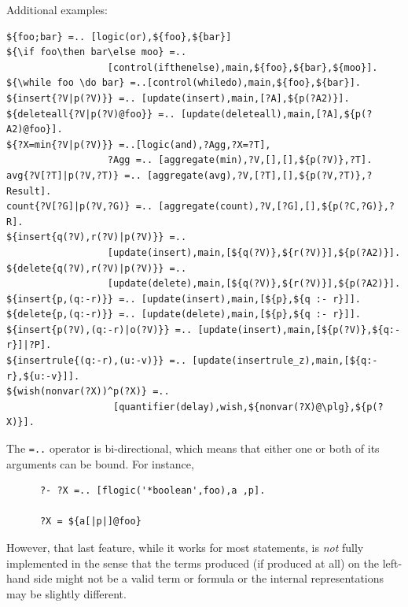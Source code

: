 \documentclass[11pt]{article}
\newcommand{\ERGO}{\mbox{\smaller{\ensuremath{\cal{E}}\smaller{{\sc{RGO}}}}}\xspace}
\newcommand{\FLSYSTEM}{\ERGO}
\begin{document}
\noindent
Additional examples:
\begin{verbatim}
${foo;bar} =.. [logic(or),${foo},${bar}]
${\if foo\then bar\else moo} =..
                  [control(ifthenelse),main,${foo},${bar},${moo}].
${\while foo \do bar} =..[control(whiledo),main,${foo},${bar}].
${insert{?V|p(?V)}} =.. [update(insert),main,[?A],${p(?A2)}].
${deleteall{?V|p(?V)@foo}} =.. [update(deleteall),main,[?A],${p(?A2)@foo}].
${?X=min{?V|p(?V)}} =..[logic(and),?Agg,?X=?T],
                  ?Agg =.. [aggregate(min),?V,[],[],${p(?V)},?T].
avg{?V[?T]|p(?V,?T)} =.. [aggregate(avg),?V,[?T],[],${p(?V,?T)},?Result].
count{?V[?G]|p(?V,?G)} =.. [aggregate(count),?V,[?G],[],${p(?C,?G)},?R].
${insert{q(?V),r(?V)|p(?V)}} =..
                  [update(insert),main,[${q(?V)},${r(?V)}],${p(?A2)}].
${delete{q(?V),r(?V)|p(?V)}} =..
                  [update(delete),main,[${q(?V)},${r(?V)}],${p(?A2)}].
${insert{p,(q:-r)}} =.. [update(insert),main,[${p},${q :- r}]].
${delete{p,(q:-r)}} =.. [update(delete),main,[${p},${q :- r}]].
${insert{p(?V),(q:-r)|o(?V)}} =.. [update(insert),main,[${p(?V)},${q:-r}]|?P].
${insertrule{(q:-r),(u:-v)}} =.. [update(insertrule_z),main,[${q:-r},${u:-v}]].
${wish(nonvar(?X))^p(?X)} =..
                   [quantifier(delay),wish,${nonvar(?X)@\plg},${p(?X)}].
\end{verbatim}

The {\tt =..} operator is bi-directional, which means that either one or
both of its arguments can be bound. For instance, 
\begin{verbatim}
      ?- ?X =.. [flogic('*boolean',foo),a ,p].
 
      ?X = ${a[|p|]@foo}
\end{verbatim}
However, that last feature, while it works for most statements,
is \emph{not} fully implemented in the sense
that the terms produced (if produced at all) on the left-hand side might
not be a valid \FLSYSTEM term or formula or the internal representations
may be slightly different.
\end{document}
